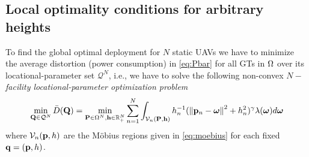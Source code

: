 \documentclass[smallabstract,smallcaptions]{dccpaper}
\newcommand{\df}{\ensuremath{\lam}}         %
\newcommand{\bH}{\ensuremath{\vh}}          %
\newcommand{\Vor}{\ensuremath{\mathcal{V}}}         %
\newcommand{\Qset}{\ensuremath{\mathcal Q}}
\newcommand{\Dis}{\ensuremath{D}}                    %
\newcommand{\AvDis}{\ensuremath{\bar{\Dis}}}         %
\begin{document}
\subsection{Local optimality conditions for arbitrary heights}
%
To find the global optimal deployment for $N$ static UAVs we have to minimize the average distortion (power consumption)
in \eqref{eq:Pbar}  for all GTs in $\Omega$ over its locational-parameter set $\Qset^N$, i.e., we have to solve the following
non-convex \emph{$N-$facility locational-parameter optimization problem} \cite{WJ18} 
%
\begin{align}
  \min_{\vQ\in\Qset^N} \AvDis(\vQ)= \min_{\vP\in\Omega^N,\bH\in \R_+^N} \sum_{n=1}^{N} \int_{\Vor_n(\vP,\bH)}
  h_n^{-1}(\Norm{\vp_n-\vome}^2 +h_n^2)^{\gam}\df(\vome)d\vome\label{eq:phoptlocal} 
\end{align}
%
where $\Vor_n(\vp,h)$ are the Möbius regions given in \eqref{eq:moebius} for each fixed ${\mathbf q}=({\mathbf p},h)$.
\end{document}
